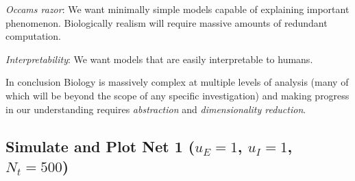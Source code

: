 \documentclass[11pt]{article}
\begin{document}
\emph{Occams razor}: We want minimally simple models capable of
explaining important phenomenon. Biologically realism will require
massive amounts of redundant computation.

\emph{Interpretability}: We want models that are easily interpretable to
humans.

In conclusion Biology is massively complex at multiple levels of
analysis (many of which will be beyond the scope of any specific
investigation) and making progress in our understanding requires
\emph{abstraction} and \emph{dimensionality reduction}.

    \hypertarget{simulate-and-plot-net-1-u_e-1-u_i-1-n_t-500}{%
\subsection{\texorpdfstring{Simulate and Plot Net 1 (\(u_E = 1\),
\(u_I = 1\),
\(N_t = 500\))}{Simulate and Plot Net 1 (u\_E = 1, u\_I = 1, N\_t = 500)}}\label{simulate-and-plot-net-1-u_e-1-u_i-1-n_t-500}}
\end{document}
